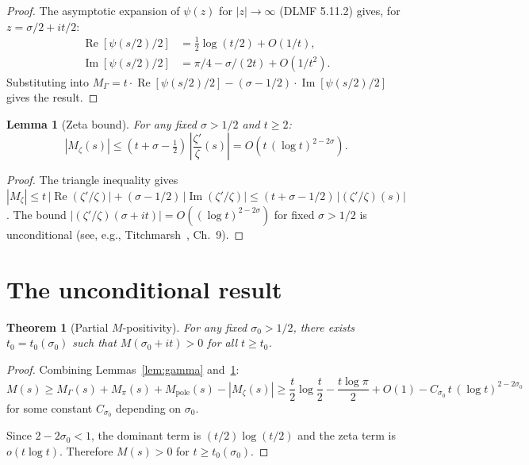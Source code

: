 \documentclass[11pt,a4paper]{article}
\newtheorem{theorem}{Theorem}
\newtheorem{lemma}{Lemma}
\DeclareMathOperator{\re}{Re}
\DeclareMathOperator{\im}{Im}
\begin{document}
\begin{proof}
The asymptotic expansion of $\psi(z)$ for $|z| \to \infty$
(DLMF 5.11.2) gives, for $z = \sigma/2 + it/2$:
\begin{align*}
  \re[\psi(s/2)/2] &= \tfrac{1}{2}\log(t/2) + O(1/t), \\
  \im[\psi(s/2)/2] &= \pi/4 - \sigma/(2t) + O(1/t^2).
\end{align*}
Substituting into $M_\Gamma = t\cdot\re[\psi(s/2)/2] -
(\sigma-1/2)\cdot\im[\psi(s/2)/2]$ gives the result.
\end{proof}

\begin{lemma}[Zeta bound]\label{lem:zeta}
For any fixed $\sigma > 1/2$ and $t \geq 2$:
\begin{equation}\label{eq:M-zeta-bound}
  |M_\zeta(s)| \leq (t + \sigma - \tfrac{1}{2})\,
    \left|\frac{\zeta'}{\zeta}(s)\right|
  = O\!\left(t\,(\log t)^{2-2\sigma}\right).
\end{equation}
\end{lemma}

\begin{proof}
The triangle inequality gives
$|M_\zeta| \leq t\,|\re(\zeta'/\zeta)| +
(\sigma-1/2)\,|\im(\zeta'/\zeta)|
\leq (t+\sigma-1/2)\,|(\zeta'/\zeta)(s)|$.
The bound $|(\zeta'/\zeta)(\sigma+it)| = O((\log t)^{2-2\sigma})$
for fixed $\sigma > 1/2$ is unconditional (see, e.g.,
Titchmarsh~\cite{titchmarsh}, Ch.~9).
\end{proof}

\section{The unconditional result}

\begin{theorem}[Partial $M$-positivity]\label{thm:partial}
For any fixed $\sigma_0 > 1/2$, there exists $t_0 = t_0(\sigma_0)$
such that $M(\sigma_0 + it) > 0$ for all $t \geq t_0$.
\end{theorem}

\begin{proof}
Combining Lemmas~\ref{lem:gamma} and~\ref{lem:zeta}:
\[
  M(s) \geq M_\Gamma(s) + M_\pi(s) + M_{\mathrm{pole}}(s)
    - |M_\zeta(s)|
  \geq \frac{t}{2}\log\frac{t}{2} - \frac{t\log\pi}{2}
    + O(1) - C_{\sigma_0}\,t\,(\log t)^{2-2\sigma_0}
\]
for some constant $C_{\sigma_0}$ depending on $\sigma_0$.

Since $2 - 2\sigma_0 < 1$, the dominant term is
$(t/2)\log(t/2)$ and the zeta term is $o(t\log t)$.
Therefore $M(s) > 0$ for $t \geq t_0(\sigma_0)$.
\end{proof}
\end{document}
